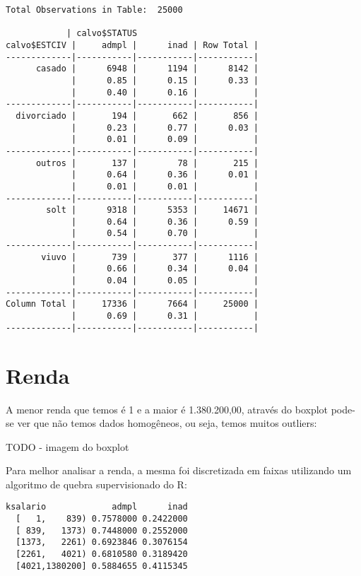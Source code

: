 \begin{lstlisting}
Total Observations in Table:  25000 

            | calvo$STATUS 
calvo$ESTCIV |     admpl |      inad | Row Total | 
-------------|-----------|-----------|-----------|
      casado |      6948 |      1194 |      8142 | 
             |      0.85 |      0.15 |      0.33 | 
             |      0.40 |      0.16 |           | 
-------------|-----------|-----------|-----------|
  divorciado |       194 |       662 |       856 | 
             |      0.23 |      0.77 |      0.03 | 
             |      0.01 |      0.09 |           | 
-------------|-----------|-----------|-----------|
      outros |       137 |        78 |       215 | 
             |      0.64 |      0.36 |      0.01 | 
             |      0.01 |      0.01 |           | 
-------------|-----------|-----------|-----------|
        solt |      9318 |      5353 |     14671 | 
             |      0.64 |      0.36 |      0.59 | 
             |      0.54 |      0.70 |           | 
-------------|-----------|-----------|-----------|
       viuvo |       739 |       377 |      1116 | 
             |      0.66 |      0.34 |      0.04 | 
             |      0.04 |      0.05 |           | 
-------------|-----------|-----------|-----------|
Column Total |     17336 |      7664 |     25000 | 
             |      0.69 |      0.31 |           | 
-------------|-----------|-----------|-----------|
\end{lstlisting}



\section{Renda}

A menor renda que temos é 1 e a maior é 1.380.200,00, através do boxplot
pode-se ver que não temos dados homogêneos, ou seja, temos muitos
outliers:

TODO - imagem do boxplot

Para melhor analisar a renda, a mesma foi discretizada em faixas utilizando
um algoritmo de quebra supervisionado do R:

\begin{lstlisting}
ksalario             admpl      inad
  [   1,    839) 0.7578000 0.2422000
  [ 839,   1373) 0.7448000 0.2552000
  [1373,   2261) 0.6923846 0.3076154
  [2261,   4021) 0.6810580 0.3189420
  [4021,1380200] 0.5884655 0.4115345
\end{lstlisting}



